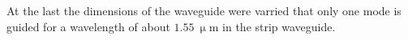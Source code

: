 \begin{figure}
\caption{}%
\label{fig:3TE}%
\end{figure}


At the last the dimensions of the waveguide were varried that only one mode is guided for a wavelength of about $1.55~\upmu$m in the strip waveguide. 

